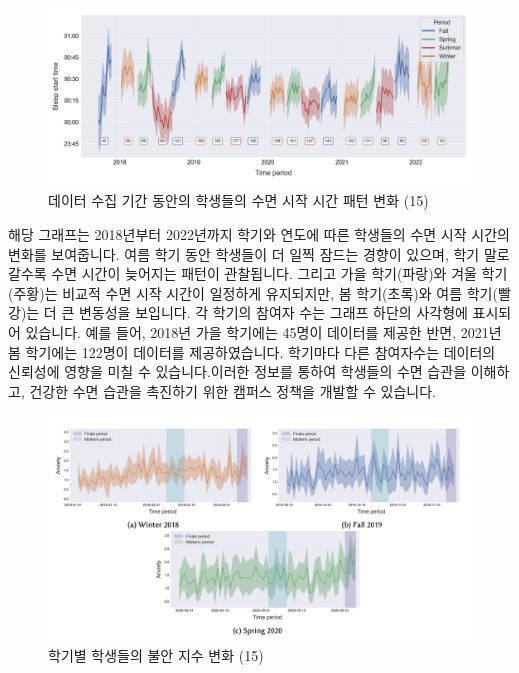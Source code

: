 \documentclass[
  letterpaper,
]{book}
\begin{document}
\begin{figure}[H]

{\centering \includegraphics{img/fig14.png}

}

\caption{데이터 수집 기간 동안의 학생들의 수면 시작 시간 패턴 변화 (15)}

\end{figure}%

해당 그래프는 2018년부터 2022년까지 학기와 연도에 따른 학생들의 수면
시작 시간의 변화를 보여줍니다. 여름 학기 동안 학생들이 더 일찍 잠드는
경향이 있으며, 학기 말로 갈수록 수면 시간이 늦어지는 패턴이 관찰됩니다.
그리고 가을 학기(파랑)와 겨울 학기(주황)는 비교적 수면 시작 시간이
일정하게 유지되지만, 봄 학기(초록)와 여름 학기(빨강)는 더 큰 변동성을
보입니다. 각 학기의 참여자 수는 그래프 하단의 사각형에 표시되어
있습니다. 예를 들어, 2018년 가을 학기에는 45명이 데이터를 제공한 반면,
2021년 봄 학기에는 122명이 데이터를 제공하였습니다. 학기마다 다른
참여자수는 데이터의 신뢰성에 영향을 미칠 수 있습니다.이러한 정보를
통하여 학생들의 수면 습관을 이해하고, 건강한 수면 습관을 촉진하기 위한
캠퍼스 정책을 개발할 수 있습니다.

\begin{figure}[H]

{\centering \includegraphics{img/fig15.png}

}

\caption{학기별 학생들의 불안 지수 변화 (15)}

\end{figure}%
\end{document}
